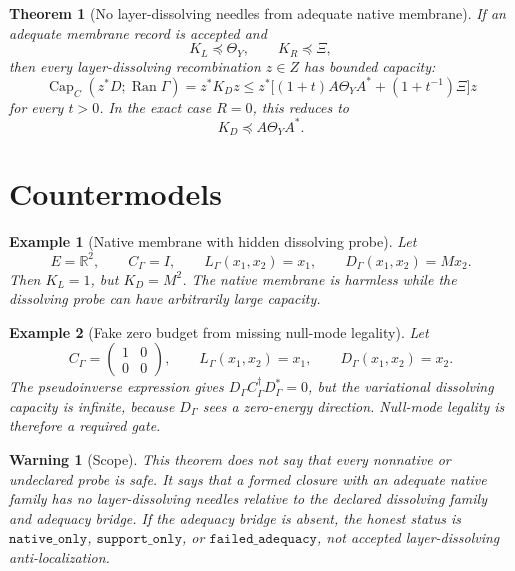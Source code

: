 \documentclass[11pt]{article}
\newtheorem{theorem}{Theorem}
\newtheorem{warning}{Warning}
\newtheorem{example}{Example}
\newcommand{\Ran}{\operatorname{Ran}}
\newcommand{\Capop}{\operatorname{Cap}}
\begin{document}
\begin{theorem}[No layer-dissolving needles from adequate native membrane]
If an adequate membrane record is accepted and
\[
        K_L\preceq \Theta_Y,\qquad K_R\preceq\Xi,
\]
then every layer-dissolving recombination \(z\in Z\) has bounded capacity:
\[
        \Capop_C(z^*D;\Ran\Gamma)
        =
        z^*K_D z
        \le
        z^*\bigl[(1+t)A\Theta_YA^*+(1+t^{-1})\Xi\bigr]z
\]
for every \(t>0\).  In the exact case \(R=0\), this reduces to
\[
        K_D\preceq A\Theta_YA^* .
\]
\end{theorem}

\section{Countermodels}

\begin{example}[Native membrane with hidden dissolving probe]
Let
\[
        E=\mathbb R^2,\qquad C_\Gamma=I,\qquad
        L_\Gamma(x_1,x_2)=x_1,\qquad
        D_\Gamma(x_1,x_2)=Mx_2 .
\]
Then \(K_L=1\), but \(K_D=M^2\).  The native membrane is harmless while the
dissolving probe can have arbitrarily large capacity.
\end{example}

\begin{example}[Fake zero budget from missing null-mode legality]
Let
\[
        C_\Gamma=\begin{pmatrix}1&0\\0&0\end{pmatrix},\qquad
        L_\Gamma(x_1,x_2)=x_1,\qquad
        D_\Gamma(x_1,x_2)=x_2.
\]
The pseudoinverse expression gives \(D_\Gamma C_\Gamma^\dagger D_\Gamma^*=0\),
but the variational dissolving capacity is infinite, because \(D_\Gamma\) sees
a zero-energy direction.  Null-mode legality is therefore a required gate.
\end{example}

\begin{warning}[Scope]
This theorem does not say that every nonnative or undeclared probe is safe.  It
says that a formed closure with an adequate native family has no
layer-dissolving needles \emph{relative to the declared dissolving family and
adequacy bridge}.  If the adequacy bridge is absent, the honest status is
\(\texttt{native\_only}\), \(\texttt{support\_only}\), or
\(\texttt{failed\_adequacy}\), not accepted layer-dissolving anti-localization.
\end{warning}
\end{document}
